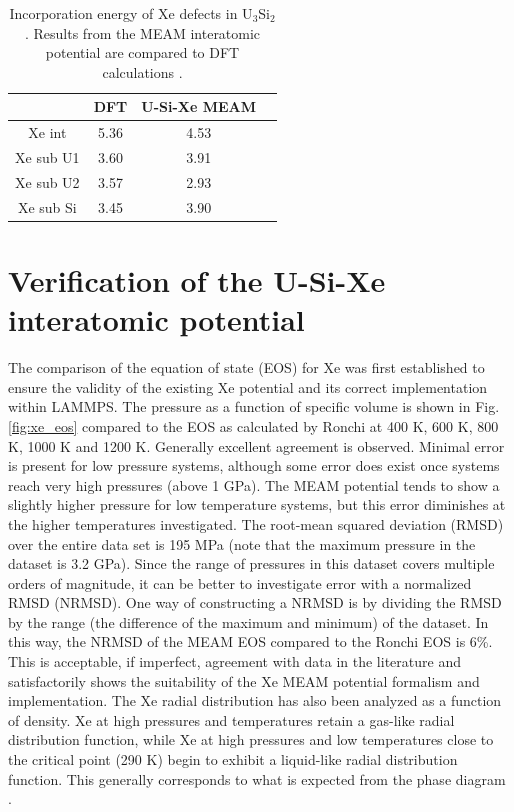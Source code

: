 \documentclass[review]{elsarticle}
\providecommand{\DIFaddtex}[1]{{\protect\color{blue} \sf #1}} %
\providecommand{\DIFaddbegin}{} %
\providecommand{\DIFaddend}{} %
\providecommand{\DIFadd}[1]{\texorpdfstring{\DIFaddtex{#1}}{#1}} %
\newcommand{\DIFaddincludegraphics}[2][]{{\color{blue}\fbox{\DIFOincludegraphics[#1]{#2}}}} %
\DeclareRobustCommand{\DIFaddbegin}{\DIFOaddbegin \let\includegraphics\DIFaddincludegraphics} %
\DeclareRobustCommand{\DIFaddend}{\DIFOaddend \let\includegraphics\DIFOincludegraphics} %
\begin{document}
\DIFaddend \begin{table}[h]
\caption{Incorporation energy of Xe defects in U$_3$Si$_2$. Results from the MEAM interatomic potential are compared to DFT calculations \cite{andersson2018}. }\label{tab:xeinc}
\begin{center}
\begin{tabular}{|c|c|c|c|}
 \hline
 & DFT & U-Si-Xe MEAM \\
 \hline
 Xe int & 5.36 & 4.53 \\ 
 Xe sub U1 & 3.60 & 3.91 \\ 
 Xe sub U2 & 3.57 & 2.93 \\ 
 Xe sub Si & 3.45 & 3.90 \\ 
 \hline
\end{tabular}
\end{center}
\label{default}
\end{table}%

\FloatBarrier

\section{Verification of the U-Si-Xe interatomic potential}

The comparison of the equation of state (EOS) for Xe was first established to ensure the validity of the existing Xe potential and its correct implementation within LAMMPS. The pressure as a function of specific volume is shown in Fig. \ref{fig:xe_eos} compared to the EOS as calculated by Ronchi \cite{ronchi1981} at 400 K, 600 K, 800 K, 1000 K and 1200 K. Generally excellent agreement is observed. Minimal error is present for low pressure systems, although some error does exist once systems reach very high pressures (above 1 GPa). The MEAM potential tends to show a slightly higher pressure for low temperature systems, but this error diminishes at the higher temperatures investigated. The root-mean squared deviation (RMSD) over the entire data set is 195 MPa (note that the maximum pressure in the dataset is 3.2 GPa). Since the range of pressures in this dataset covers multiple orders of magnitude, it can be better to investigate error with a normalized RMSD (NRMSD). One way of constructing a NRMSD is by dividing the RMSD by the range (the difference of the maximum and minimum) of the dataset. In this way, the NRMSD of the MEAM EOS compared to the Ronchi EOS is 6\%. This is acceptable, if imperfect, agreement with data in the literature and satisfactorily shows the suitability of the Xe MEAM potential formalism and implementation. \DIFaddbegin \DIFadd{The Xe radial distribution has also been analyzed as a function of density. Xe at high pressures and temperatures retain a gas-like radial distribution function, while Xe at high pressures and low temperatures close to the critical point (290 K) begin to exhibit a liquid-like radial distribution function. This generally corresponds to what is expected from the phase diagram \cite{cook1961}.
}\DIFaddend 
\end{document}
